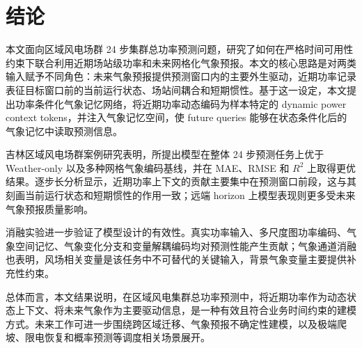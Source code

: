 \section{结论}

本文面向区域风电场群 24 步集群总功率预测问题，研究了如何在严格时间可用性约束下联合利用近期场站级功率和未来网格化气象预报。本文的核心思路是对两类输入赋予不同角色：未来气象预报提供预测窗口内的主要外生驱动，近期功率记录表征目标窗口前的当前运行状态、场站间耦合和短期惯性。基于这一设定，本文提出功率条件化气象记忆网络，将近期功率动态编码为样本特定的 dynamic power context tokens，并注入气象记忆空间，使 future queries 能够在状态条件化后的气象记忆中读取预测信息。

吉林区域风电场群案例研究表明，所提出模型在整体 24 步预测任务上优于 Weather-only 以及多种网格气象编码基线，并在 MAE、RMSE 和 \(R^2\) 上取得更优结果。逐步长分析显示，近期功率上下文的贡献主要集中在预测窗口前段，这与其刻画当前运行状态和短期惯性的作用一致；远端 horizon 上模型表现则更多受未来气象预报质量影响。

消融实验进一步验证了模型设计的有效性。真实功率输入、多尺度图功率编码、气象空间记忆、气象变化分支和变量解耦编码均对预测性能产生贡献；气象通道消融也表明，风场相关变量是该任务中不可替代的关键输入，背景气象变量主要提供补充性约束。

总体而言，本文结果说明，在区域风电集群总功率预测中，将近期功率作为动态状态上下文、将未来气象作为主要驱动信息，是一种有效且符合业务时间约束的建模方式。未来工作可进一步围绕跨区域迁移、气象预报不确定性建模，以及极端爬坡、限电恢复和概率预测等调度相关场景展开。
